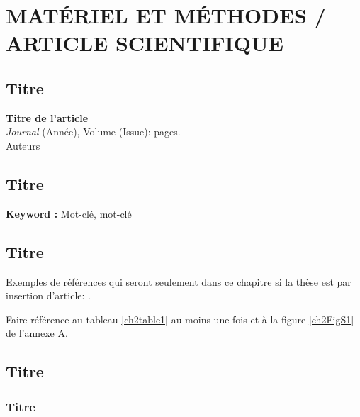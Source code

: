 \chapter{\textbf{MATÉRIEL ET MÉTHODES / ARTICLE SCIENTIFIQUE}}

\section{Titre}
\lipsum[1]
\vfill{}
\pagebreak

\begin{center}
\textbf{Titre de l'article} \\
\textit{Journal} (Année), Volume (Issue): pages. \\
Auteurs
\end{center}

\section{Titre}
\lipsum[1]
\vfill{}
\textbf{Keyword :} Mot-clé, mot-clé
\pagebreak

\section{Titre}
Exemples de références qui seront seulement dans ce chapitre si la thèse est par insertion d'article: \cite{Thackeray2010, Siepielski2017}.

Faire référence au tableau \ref{ch2table1} au moins une fois et à la figure \ref{ch2FigS1} de l'annexe A.  %

\section{Titre}
\subsection{Titre}


\lipsum[2-4]


\singlespacing 
{\renewcommand{\bibname}{References}
\renewcommand{\bibsection}{\section{\bibname}}
}
 

